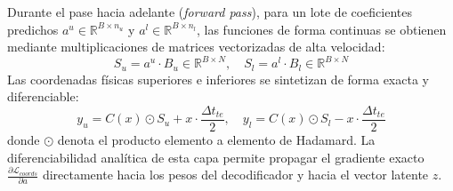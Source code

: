 Durante el pase hacia adelante (\textit{forward pass}), para un lote de coeficientes predichos $a^u \in \mathbb{R}^{B \times n_u}$ y $a^l \in \mathbb{R}^{B \times n_l}$, las funciones de forma continuas se obtienen mediante multiplicaciones de matrices vectorizadas de alta velocidad:
\begin{equation}
    S_u = a^u \cdot B_u \in \mathbb{R}^{B \times N}, \quad S_l = a^l \cdot B_l \in \mathbb{R}^{B \times N}
\end{equation}
Las coordenadas físicas superiores e inferiores se sintetizan de forma exacta y diferenciable:
\begin{equation}
    y_u = C(x) \odot S_u + x \cdot \frac{\Delta t_{te}}{2}, \quad y_l = C(x) \odot S_l - x \cdot \frac{\Delta t_{te}}{2}
\end{equation}
donde $\odot$ denota el producto elemento a elemento de Hadamard. La diferenciabilidad analítica de esta capa permite propagar el gradiente exacto $\frac{\partial \mathcal{L}_{coords}}{\partial a}$ directamente hacia los pesos del decodificador y hacia el vector latente $z$.



